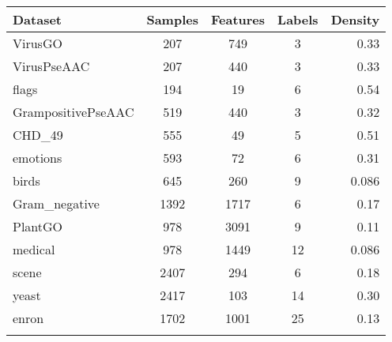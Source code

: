 \documentclass[conference,compsoc]{IEEEtran}
\begin{document}
\begin{table}[htbp]
    \scriptsize
    \centering
    \begin{tabular}{lcccr}
        \toprule
        \textbf{Dataset} & \textbf{Samples} & \textbf{Features} & \textbf{Labels} & \textbf{Density} \\
        \midrule
        VirusGO              & 207 & 749  & 3   & 0.33\\%
        VirusPseAAC          & 207 & 440  & 3   & 0.33\\%
        flags                & 194 & 19   & 6   & 0.54\\%
        GrampositivePseAAC  & 519 & 440  & 3   & 0.32\\%
        CHD\_49              & 555 & 49   & 5   & 0.51\\%
        emotions             & 593 & 72   & 6   & 0.31\\%
        birds                & 645 & 260  & 9   & 0.086\\%
        Gram\_negative       & 1392 & 1717 & 6  & 0.17\\%
        PlantGO              & 978 & 3091  & 9  & 0.11\\%
        medical              & 978 & 1449 & 12 & 0.086\\%
        scene                & 2407 & 294 & 6   & 0.18\\%
        yeast                & 2417 & 103 & 14  & 0.30\\%
        enron                & 1702 & 1001 & 25 & 0.13\\%
        \bottomrule\\
    \end{tabular}
    

\end{table}
\end{document}
